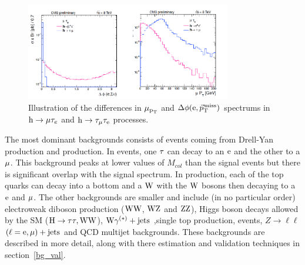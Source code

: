 \begin{figure}
\begin{center}
\includegraphics[width=0.8\textwidth,keepaspectratio]{plots_and_figures/chapter5/htt_v_lfv.pdf}
\caption{Illustration of the differences in $\mu_{\text{p}_\text{T}}$ and $\Delta\phi(\text{e}, {\vec p}_{\mathrm{T}}^{\kern1pt\text{miss}})$ spectrums in $\text{h} \to \mu \tau_{e}$ and $\text{h} \to \tau_{\mu}\tau_{\text{e}}$ processes.}
\label{fig:htt_v_lfv}
\end{center}
\end{figure}

The most dominant backgrounds consists of \ztt events coming from Drell-Yan production and \ttb production. In \ztt events, one $\tau$ can decay to an $\text{e}$ and the other to a $\mu$. This background peaks at lower values of $M_{col}$ than the signal events but there is significant overlap with the signal spectrum. In \ttb production, each of the top quarks can decay into a bottom and a $\text{W}$ with the $\text{W}$ bosons then decaying to a $\text{e}$ and $\mu$. The other backgrounds are smaller and include (in no particular order) electroweak diboson production ($\text{W}\text{W}$, $\text{W}\text{Z}$ and $\text{Z}\text{Z}$), Higgs boson decays allowed by the SM ($\text{H} \to \tau\tau,\text{W}\text{W}$), $\text{W}\gamma^{(*)}+\text{jets}$ ,single top production, \wjets events, $Z\to\ell\ell$ $(\ell = \text{e}, \mu)+\text{jets}$ and QCD multijet backgrounds. These backgrounds are described in more detail, along with there estimation and validation techniques in section~\ref{bg_val}.        


